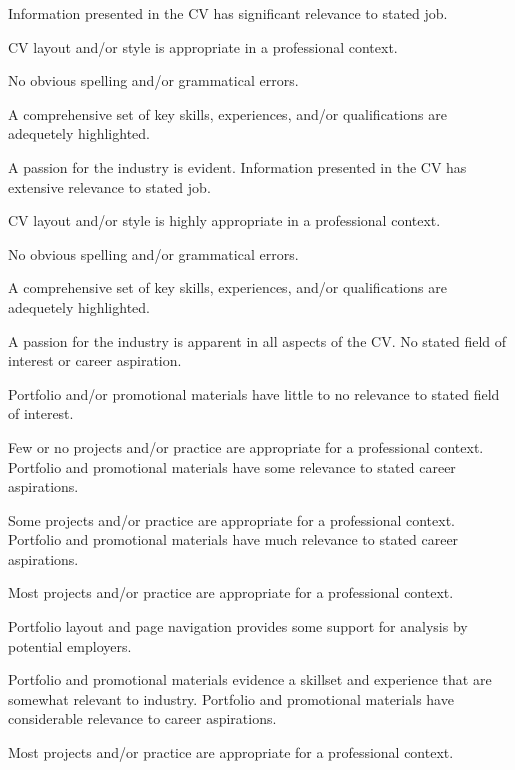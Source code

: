 \documentclass{../../fal_assignment}
\begin{document}
\begin{markingrubric}
        \grade 				Information presented in the CV has significant relevance to stated job.
		\par			CV layout and/or style is appropriate in a professional context.
		\par			No obvious spelling and/or grammatical errors.
        		\par 			A comprehensive set of key skills, experiences, and/or qualifications are adequetely highlighted. 
		\par			A passion for the industry is evident.
        \grade 				Information presented in the CV has extensive relevance to stated job.
		\par			CV layout and/or style is highly appropriate in a professional context.   
		\par			No obvious spelling and/or grammatical errors.
        		\par 			A comprehensive set of key skills, experiences, and/or qualifications are adequetely highlighted. 
		\par 			A passion for the industry is apparent in all aspects of the CV.
%        
        \grade \fail  			No stated field of interest or career aspiration.
        		\par 			Portfolio and/or promotional materials have little to no relevance to stated field of interest.
        		\par 			Few or no projects and/or practice are appropriate for a professional context.	
        \grade 				Portfolio and promotional materials have some relevance to stated career aspirations.
        		\par 			Some projects and/or practice are appropriate for a professional context.
	\grade 			Portfolio and promotional materials have much relevance to stated career aspirations.
		\par			Most projects and/or practice are appropriate for a professional context.
        		\par 			Portfolio layout and page navigation provides some support for analysis by potential employers.
		\par			Portfolio and promotional materials evidence a skillset and experience that are somewhat relevant to industry.
        \grade 				Portfolio and promotional materials have considerable relevance to career aspirations.
        		\par 			Most projects and/or practice are appropriate for a professional context.

\end{markingrubric}
\end{document}

